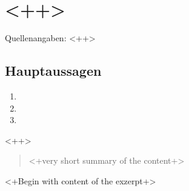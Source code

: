 \documentclass[a4paper, abstract=on]{scrartcl}
\begin{document}
\section*{<++>}
Quellenangaben: <++>

\vspace{0.5cm}

\subsection*{Hauptaussagen}

\begin{enumerate}
\item <+FIRST  argument+>
\item <+SECOND argument+>
\item <+THIRD  argument+>
\end{enumerate}<++>

\begin{abstract}
<+very short summary of the content+>
\end{abstract}
\vspace{1cm}

<+Begin with content of the exzerpt+>

\printbibliography
\end{document}
